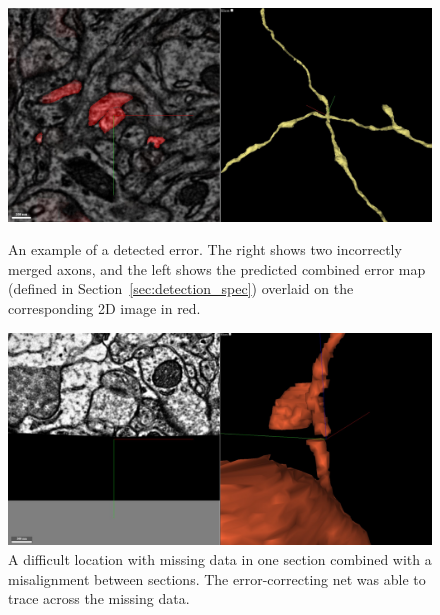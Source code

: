 \documentclass{article}
\begin{document}
\begin{figure}
	\begin{minipage}[t]{0.47\textwidth}
\begin{center}
	\includegraphics[width=1.0\linewidth]{x_error.jpg}
	\caption{An example of a detected error. The right shows two incorrectly
	merged axons, and the left shows the predicted combined error map (defined
	in Section~\ref{sec:detection_spec}) overlaid on the corresponding 2D image
	in red.}
    \label{fig:x_error}
\end{center}
\end{minipage}
\hfill
	\begin{minipage}[t]{0.47\textwidth}
\begin{center}
	\includegraphics[width=1.0\linewidth]{difficult.jpg}
	\caption{A difficult location with missing data in one section combined with a misalignment between sections. The error-correcting net was able to trace across the missing data.}
	\label{fig:difficult}
\end{center}
\end{minipage}
\end{figure}
\end{document}
